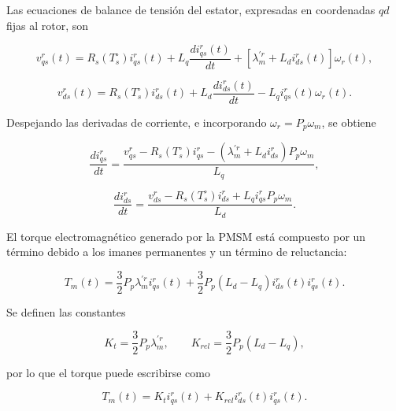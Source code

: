 \documentclass[10pt,a4paper]{article}
\begin{document}
Las ecuaciones de balance de tensión del estator, expresadas en coordenadas \(qd\) fijas al rotor, son

\begin{equation}
    v_{qs}^{r}(t)
    =
    R_s\left(T_s^{\circ}\right)i_{qs}^{r}(t)
    +
    L_q\frac{d i_{qs}^{r}(t)}{dt}
    +
    \left[\lambda_m^{\prime r}+L_d i_{ds}^{r}(t)\right]\omega_r(t),
    \label{eq:vq_pmsm}
\end{equation}

\begin{equation}
    v_{ds}^{r}(t)
    =
    R_s\left(T_s^{\circ}\right)i_{ds}^{r}(t)
    +
    L_d\frac{d i_{ds}^{r}(t)}{dt}
    -
    L_q i_{qs}^{r}(t)\omega_r(t).
    \label{eq:vd_pmsm}
\end{equation}

Despejando las derivadas de corriente, e incorporando \(\omega_r=P_p\omega_m\), se obtiene

\begin{equation}
    \frac{d i_{qs}^{r}}{dt}
    =
    \frac{
    v_{qs}^{r}
    -
    R_s\left(T_s^{\circ}\right)i_{qs}^{r}
    -
    \left(\lambda_m^{\prime r}+L_d i_{ds}^{r}\right)P_p\omega_m
    }{L_q},
    \label{eq:iq_dot_nl}
\end{equation}

\begin{equation}
    \frac{d i_{ds}^{r}}{dt}
    =
    \frac{
    v_{ds}^{r}
    -
    R_s\left(T_s^{\circ}\right)i_{ds}^{r}
    +
    L_q i_{qs}^{r}P_p\omega_m
    }{L_d}.
    \label{eq:id_dot_nl}
\end{equation}

El torque electromagnético generado por la PMSM está compuesto por un término debido a los imanes permanentes y un término de reluctancia:

\begin{equation}
    T_m(t)
    =
    \frac{3}{2}P_p\lambda_m^{\prime r}i_{qs}^{r}(t)
    +
    \frac{3}{2}P_p\left(L_d-L_q\right)i_{ds}^{r}(t)i_{qs}^{r}(t).
    \label{eq:torque_pmsm}
\end{equation}

Se definen las constantes

\begin{equation}
    K_t=\frac{3}{2}P_p\lambda_m^{\prime r},
    \qquad
    K_{rel}=\frac{3}{2}P_p\left(L_d-L_q\right),
    \label{eq:kt_krel}
\end{equation}

por lo que el torque puede escribirse como

\begin{equation}
    T_m(t)=K_t i_{qs}^{r}(t)+K_{rel}i_{ds}^{r}(t)i_{qs}^{r}(t).
    \label{eq:torque_pmsm_compacto}
\end{equation}
\end{document}

